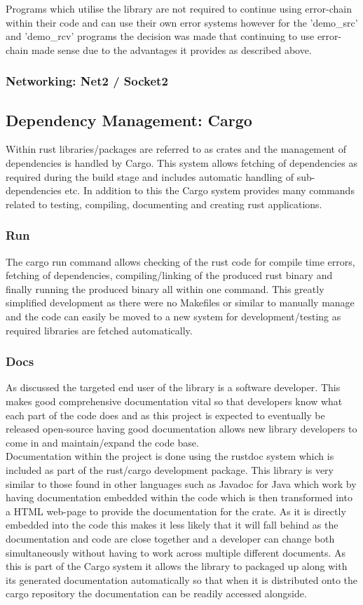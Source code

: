 \documentclass[11pt,a4paper]{article}
\begin{document}
Programs which utilise the library are not required to continue using error-chain within their code and can use their own error systems however for the 'demo\_src' and 'demo\_rcv' programs the decision was made that continuing to use error-chain made sense due to the advantages it provides as described above.

\subsubsection{Networking: Net2 / Socket2}
\subsection{Dependency Management: Cargo}
Within rust libraries/packages are referred to as crates and the management of dependencies is handled by Cargo. This system allows fetching of dependencies as required during the build stage and includes automatic handling of sub-dependencies etc. In addition to this the Cargo system provides many commands related to testing, compiling, documenting and creating rust applications.

\subsubsection{Run}
The cargo run command allows checking of the rust code for compile time errors, fetching of dependencies, compiling/linking of the produced rust binary and finally running the produced binary all within one command. This greatly simplified development as there were no Makefiles or similar to manually manage and the code can easily be moved to a new system for development/testing as required libraries are fetched automatically.

\subsubsection{Docs}
As discussed the targeted end user of the library is a software developer. This makes good comprehensive documentation vital so that developers know what each part of the code does and as this project is expected to eventually be released open-source having good documentation allows new library developers to come in and maintain/expand the code base.\\

Documentation within the project is done using the rustdoc system which is included as part of the rust/cargo development package. This library is very similar to those found in other languages such as Javadoc for Java which work by having documentation embedded within the code which is then transformed into a HTML web-page to provide the documentation for the crate. As it is directly embedded into the code this makes it less likely that it will fall behind as the documentation and code are close together and a developer can change both simultaneously without having to work across multiple different documents. As this is part of the Cargo system it allows the library to packaged up along with its generated documentation automatically so that when it is distributed onto the cargo repository the documentation can be readily accessed alongside.
\end{document}

